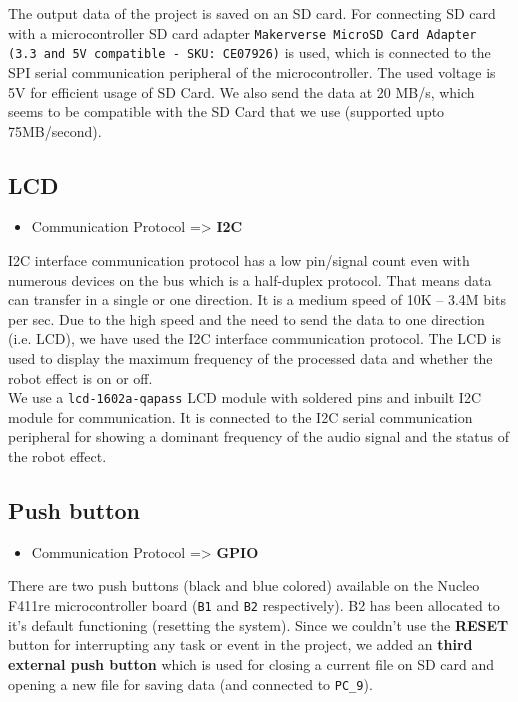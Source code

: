 \documentclass[11pt]{article}
\begin{document}
The output data of the project is saved on an SD card. For connecting SD card with a microcontroller SD card adapter \texttt{Makerverse MicroSD Card Adapter (3.3 and 5V compatible - SKU: CE07926)} is used, which is connected to the SPI serial communication peripheral of the microcontroller. The used voltage is 5V for efficient usage of SD Card. We also send the data at 20 MB/s, which seems to be compatible with the SD Card that we use (supported upto 75MB/second).

\subsection{LCD}
\label{sec:orgd0d6601}

\begin{itemize}
\item Communication Protocol => \textbf{I2C}
\end{itemize}

I2C interface communication protocol has a low pin/signal count even with numerous devices on the bus which is a half-duplex protocol. That means data can transfer in a single or one direction. It is a medium speed of 10K – 3.4M bits per sec. Due to the high speed and the need to send the data to one direction (i.e. LCD), we have used the I2C interface communication protocol. The LCD is used to display the maximum frequency of the processed data and whether the robot effect is on or off. \\[0pt]

We use a \texttt{lcd-1602a-qapass} LCD module with soldered pins and inbuilt I2C module for communication. It is connected to the I2C serial communication peripheral for showing a dominant frequency of the audio signal and the status of the robot effect.

\subsection{Push button}
\label{sec:org508cdc6}

\begin{itemize}
\item Communication Protocol => \textbf{GPIO}
\end{itemize}

There are two push buttons (black and blue colored) available on the Nucleo F411re microcontroller board (\texttt{B1} and \texttt{B2} respectively). B2 has been allocated to it's default functioning (resetting the system). Since we couldn’t use the \textbf{RESET} button for interrupting any task or event in the project, we added an \textbf{third external push button} which is used for closing a current file on SD card and opening a new file for saving data (and connected to \texttt{PC\_9}). \\[0pt]
\end{document}

